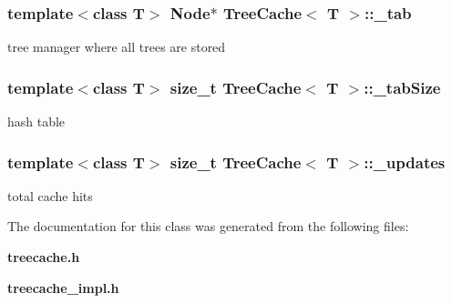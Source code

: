 \subsubsection{\setlength{\rightskip}{0pt plus 5cm}template$<$class T$>$ {\bf Node}$\ast$ {\bf Tree\-Cache}$<$ T $>$::{\bf \_\-tab}\hspace{0.3cm}{\tt  [protected]}}\label{classTreeCache_p1}


tree manager where all trees are stored 

\subsubsection{\setlength{\rightskip}{0pt plus 5cm}template$<$class T$>$ size\_\-t {\bf Tree\-Cache}$<$ T $>$::{\bf \_\-tab\-Size}\hspace{0.3cm}{\tt  [protected]}}\label{classTreeCache_p2}


hash table 

\subsubsection{\setlength{\rightskip}{0pt plus 5cm}template$<$class T$>$ size\_\-t {\bf Tree\-Cache}$<$ T $>$::{\bf \_\-updates}}\label{classTreeCache_o1}


total cache hits 



The documentation for this class was generated from the following files:\begin{CompactItemize}
\item 
{\bf treecache.h}\item 
{\bf treecache\_\-impl.h}\end{CompactItemize}
